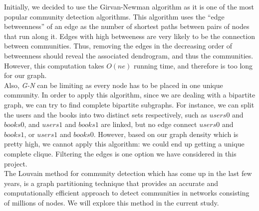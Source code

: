 \documentclass[11pt]{article}
\begin{document}
Initially, we decided to use the Girvan-Newman algorithm as it is one of the most popular community detection algorithms\cite{newman}. This algorithm uses the ``edge betweenness'' of an edge as the number of shortest paths between pairs of nodes that run along it. Edges with high betweeness are very likely to be the connection between communities.
Thus, removing the edges in the decreasing order of betweenness should reveal the associated dendrogram, and thus the communities. However, this computation takes $O(ne)$ running time, and therefore is too long for our graph.\\

Also, \textit{G-N} can be limiting as every node has to be placed in one unique community.
In order to apply this algorithm, since we are dealing with a bipartite graph, we can try to find complete bipartite subgraphs.
For instance, we can split the users and the books into two distinct sets respectively, such as $users0$ and $books0$, and $users1$ and $books1$ are linked, but no edge connect $users0$ and $books1$, or $users1$ and $books0$.
However, based on our graph density which is pretty high, we cannot apply this algorithm: we could end up getting a unique complete clique.
Filtering the edges is one option we have considered in this project.\\

The Louvain\cite{louvain} method for community detection which has come up in the last few years, is a graph partitioning technique that provides an accurate and computationally efficient approach to detect communities in networks consisting of millions of nodes. We will explore this method in the current study.

\end{document}
